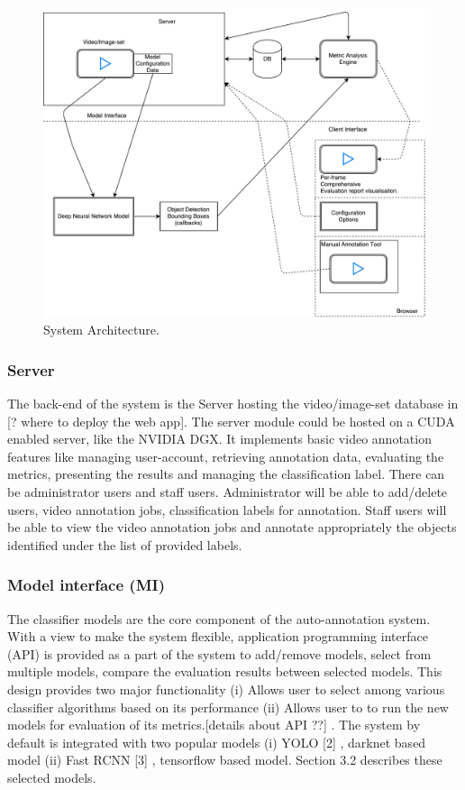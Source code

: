 \documentclass[conference]{IEEEtran}
\newcommand{\figwidthb}{0.80\linewidth}
\begin{document}
\begin{figure}[htb]
\centering
\includegraphics[width=\figwidthb]{fig/system_architecture.pdf}
\caption{System Architecture.} \label{fig.structure}
\end{figure}

\subsubsection{Server}
The back-end of the system is the Server hosting  the  video/image-set database in [? where to deploy the web app]. The server module could be hosted on a CUDA enabled server, like the NVIDIA DGX. It implements basic video annotation features like managing user-account, retrieving annotation data, evaluating the metrics, presenting the results and managing the classification label. There can be administrator users and staff users. Administrator will be able to add/delete users, video annotation jobs, classification labels for annotation. Staff users will be able to view the video annotation jobs and annotate appropriately the objects identified under the list of provided labels.
\subsubsection{Model interface (MI)}
The classifier models are the core component of the auto-annotation system. With a view to make the system flexible, application programming interface (API) is provided as a part of the system to add/remove models, select from multiple models, compare the  evaluation results between selected models. This design provides two major functionality (i) Allows user to select among various classifier algorithms based on its performance (ii)  Allows user to  to run the new models for evaluation of its metrics.[details about API ??] . The system by default is integrated with two popular models (i) YOLO [2] , darknet based model (ii) Fast RCNN [3] , tensorflow based model. Section 3.2 describes these selected models.
\end{document}
